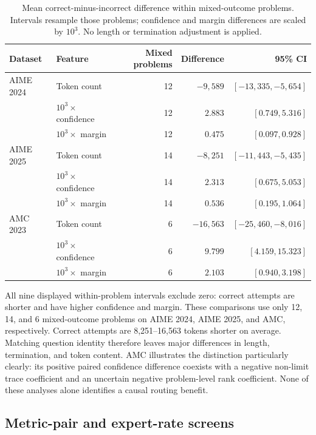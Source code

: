 \begin{table}[t]
\centering
\small
\caption{Mean correct-minus-incorrect difference within mixed-outcome problems. Intervals resample those problems; confidence and margin differences are scaled by $10^3$. No length or termination adjustment is applied. }
\label{tab:qwen-corr-within}
\begin{tabular}{@{}llrrr@{}}
\toprule
Dataset & Feature & Mixed problems & Difference & 95\% CI \\
\midrule
AIME 2024 & Token count & 12 & $-9,589$ & $[-13,335,-5,654]$ \\
 & $10^3\!\times$ confidence & 12 & $2.883$ & $[0.749,5.316]$ \\
 & $10^3\!\times$ margin & 12 & $0.475$ & $[0.097,0.928]$ \\
AIME 2025 & Token count & 14 & $-8,251$ & $[-11,443,-5,435]$ \\
 & $10^3\!\times$ confidence & 14 & $2.313$ & $[0.675,5.053]$ \\
 & $10^3\!\times$ margin & 14 & $0.536$ & $[0.195,1.064]$ \\
AMC 2023 & Token count & 6 & $-16,563$ & $[-25,460,-8,016]$ \\
 & $10^3\!\times$ confidence & 6 & $9.799$ & $[4.159,15.323]$ \\
 & $10^3\!\times$ margin & 6 & $2.103$ & $[0.940,3.198]$ \\
\bottomrule
\end{tabular}
\end{table}

All nine displayed within-problem intervals exclude zero: correct attempts
are shorter and have higher confidence and margin. These comparisons use
only 12, 14, and 6 mixed-outcome problems on AIME 2024, AIME 2025, and AMC,
respectively. Correct attempts are 8,251--16,563 tokens shorter on average.
Matching question identity therefore leaves major differences in length,
termination, and token content. AMC illustrates the distinction particularly
clearly: its positive paired confidence difference coexists with a negative
non-limit trace coefficient and an uncertain negative problem-level rank
coefficient. None of these analyses alone identifies a causal routing benefit.

\subsection{Metric-pair and expert-rate screens}

